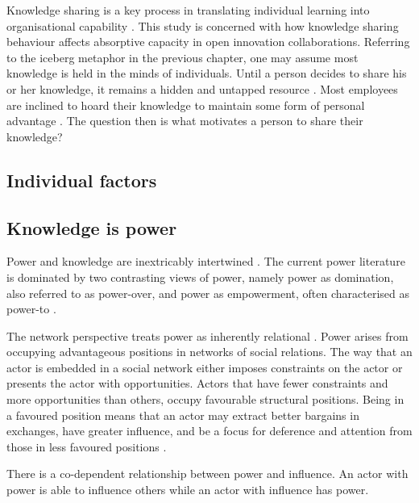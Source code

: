 Knowledge sharing is a key process in translating individual learning into organisational capability \citep{lam2010knowledge}. This study is concerned with how knowledge sharing behaviour affects absorptive capacity in open innovation collaborations. Referring to the iceberg metaphor in the previous chapter, one may assume most knowledge is held in the minds of individuals. Until a person decides to share his or her knowledge, it remains a hidden and untapped resource \citep{davenport1998working}. Most employees are inclined to hoard their knowledge to maintain some form of personal advantage \citep{riege2005three,milne2007motivation}. The question then is what motivates a person to share their knowledge?  \medskip



\subsection{Individual factors}

\subsection{Knowledge is power}

Power and knowledge are inextricably intertwined \citep{gaventa2007power}. The current power literature is dominated by two contrasting views of power, namely power as domination, also referred to as power-over, and power as empowerment, often characterised as power-to \citep{haugaard2012rethinking}. 




The network perspective treats power as inherently relational \citep{ibarra1993network}. Power arises from occupying advantageous positions in networks of social relations. The way that an actor is embedded in a social network either imposes constraints on the actor or presents the actor with opportunities. Actors that have fewer constraints and more opportunities than others, occupy favourable structural positions. Being in a favoured position means that an actor may extract better bargains in exchanges, have greater influence, and be a focus for deference and attention from those in less favoured positions \citep{burt1992structural,hanneman2005introduction}. 

There is a co-dependent relationship between power and influence. An actor with power is able to influence others while an actor with influence has power. 

